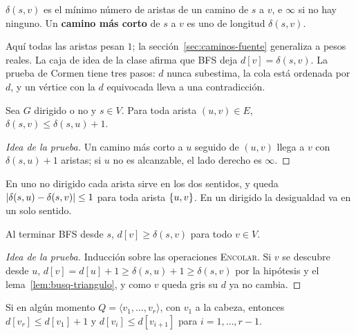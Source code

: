 \documentclass[11pt,letterpaper]{article}
\begin{document}
\begin{definicion}
  $\delta(s, v)$ es el mínimo número de aristas de un camino de $s$ a
  $v$, e $\infty$ si no hay ninguno. Un \textbf{camino más corto} de
  $s$ a $v$ es uno de longitud $\delta(s, v)$.
\end{definicion}

Aquí todas las aristas pesan $1$; la sección~\ref{sec:caminos-fuente}
generaliza a pesos reales. La caja de idea de la clase afirma que BFS
deja $d[v] = \delta(s, v)$. La prueba de Cormen tiene tres pasos: $d$
nunca subestima, la cola está ordenada por $d$, y un vértice con la
$d$ equivocada lleva a una contradicción.

\begin{lema}
  \label{lem:busq-triangulo}
  Sea $G$ dirigido o no y $s \in V$. Para toda arista $(u, v) \in E$,
  $\delta(s, v) \leq \delta(s, u) + 1$.
\end{lema}

\begin{proof}[Idea de la prueba]
  Un camino más corto a $u$ seguido de $(u, v)$ llega a $v$ con
  $\delta(s, u) + 1$ aristas; si $u$ no es alcanzable, el lado derecho
  es $\infty$.
\end{proof}

En uno no dirigido cada arista sirve en los dos sentidos, y queda
$\left\lvert \delta(s, u) - \delta(s, v) \right\rvert \leq 1$ para toda arista
$\left\{ u, v \right\}$. En un dirigido la desigualdad va en un solo sentido.

\begin{lema}
  \label{lem:busq-cota-d}
  Al terminar BFS desde $s$, $d[v] \geq \delta(s, v)$ para todo
  $v \in V$.
\end{lema}

\begin{proof}[Idea de la prueba]
  Inducción sobre las operaciones \textsc{Encolar}. Si $v$ se descubre
  desde $u$, $d[v] = d[u] + 1 \geq \delta(s, u) + 1 \geq \delta(s, v)$
  por la hipótesis y el lema~\ref{lem:busq-triangulo}, y como $v$
  queda gris su $d$ ya no cambia.
\end{proof}

\begin{lema}
  \label{lem:busq-cola}
  Si en algún momento $Q = \langle v_1, \dots, v_r \rangle$, con $v_1$
  a la cabeza, entonces $d[v_r] \leq d[v_1] + 1$ y
  $d[v_i] \leq d[v_{i+1}]$ para $i = 1, \dots, r - 1$.
\end{lema}
\end{document}
